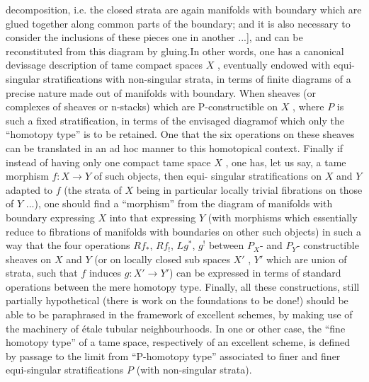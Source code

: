 
decomposition, i.e. the closed strata are again manifolds with boundary which
are glued together along common parts of the boundary; and it is also
necessary to consider the inclusions of these pieces one in another ...],
and can be reconstituted from this diagram by gluing.In other words, one
has a canonical devissage description of tame compact spaces $X$ , eventually
endowed with equi-singular stratifications with non-singular strata, in terms
of finite diagrams of a precise nature made out of manifolds with boundary.
When  sheaves (or complexes of sheaves\hand{,} or n-stacks) which
are P-constructible on $X$ , where $P$ is such a fixed stratification, 
 in terms of the envisaged diagram\hand{,}of which only the ``homotopy
type'' is to be retained. One  that the six operations on these sheaves
can be translated in an ad hoc manner to this homotopical context. Finally\hand{,}
if instead of having only one compact tame space $X$ , one has, let us say,
a tame morphism $f : X \to Y$ of such objects, then  equi-%
singular stratifications on $X$ and $Y$ adapted to $f$ (the strata of $X$
being in particular locally trivial fibrations on those of $Y$ ...), one
should find a ``morphism'' from the diagram of manifolds with boundary
expressing $X$ into that expressing $Y$ (with  morphisms which
essentially reduce to fibrations of  manifolds with boundaries on other such
objects) in such a way that the four operations $Rf_*$, $Rf_!$, $Lg^*$, $g^!$ between
$P_X$- and $P_Y$- constructible sheaves on $X$ and $Y$ (or on locally closed
sub spaces $X'$ , $Y'$ which are union of strata, such that $f$ induces
$g : X' \to Y'$) can be expressed in terms of standard operations between the
mere homotopy type. Finally, all these constructions, still partially
hypothetical (there is work on the foundations to be done!) should be able
to be paraphrased in the framework of excellent schemes, by making use of
the machinery of étale tubular neighbourhoods. In one or other case, the
``fine homotopy type'' of a tame space, respectively of an excellent scheme,
is defined by passage to the limit from ``P-homotopy type'' associated to finer
and finer equi-singular stratifications $P$ (with non-singular strata).


